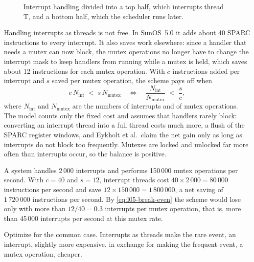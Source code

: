 \documentclass[../main.tex]{subfiles}
\begin{document}
\begin{figure}[htbp]
  \centering
  
  \caption{Interrupt handling divided into a top half, which interrupts
    thread T, and a bottom half, which the scheduler runs later.}
  \label{fig:l05-top-bottom}
\end{figure}

Handling interrupts as threads is not free.  In SunOS~5.0 it adds about 40 SPARC instructions to
every interrupt.  It also saves work elsewhere: since a handler that needs
a mutex can now block, the mutex operations no longer have to change the
interrupt mask to keep handlers from running while a mutex is held, which
saves about 12 instructions for each mutex operation.  With $c$
instructions added per interrupt and $s$ saved per mutex operation, the
scheme pays off when
\begin{equation}
  c\, N_{\mathrm{int}} \;<\; s\, N_{\mathrm{mutex}}
  \quad\Longleftrightarrow\quad
  \frac{N_{\mathrm{int}}}{N_{\mathrm{mutex}}} \;<\; \frac{s}{c},
  \label{eq:l05-break-even}
\end{equation}
where $N_{\mathrm{int}}$ and $N_{\mathrm{mutex}}$ are the numbers of
interrupts and of mutex operations.  The model counts only the fixed cost and assumes
that handlers rarely block: converting an interrupt thread into a full
thread costs much more, a flush of the SPARC register windows, and Eykholt
et al.\ claim the net gain only as long as interrupts do not block too
frequently.  Mutexes are locked and unlocked far more often than
interrupts occur, so the balance is positive.

\begin{example}
  A system handles 2\,000 interrupts and performs 150\,000 mutex operations
  per second.  With $c = 40$ and $s = 12$, interrupt threads cost
  $40 \times 2\,000 = 80\,000$ instructions per second and save
  $12 \times 150\,000 = 1\,800\,000$, a net saving of $1\,720\,000$
  instructions per second.  By \cref{eq:l05-break-even} the scheme would
  lose only with more than $12/40 = 0.3$ interrupts per mutex operation,
  that is, more than 45\,000 interrupts per second at this mutex rate.
\end{example}

\begin{keypoint}
  Optimize for the common case.  Interrupts as threads make the rare event,
  an interrupt, slightly more expensive, in exchange for making the
  frequent event, a mutex operation, cheaper.
\end{keypoint}
\end{document}
